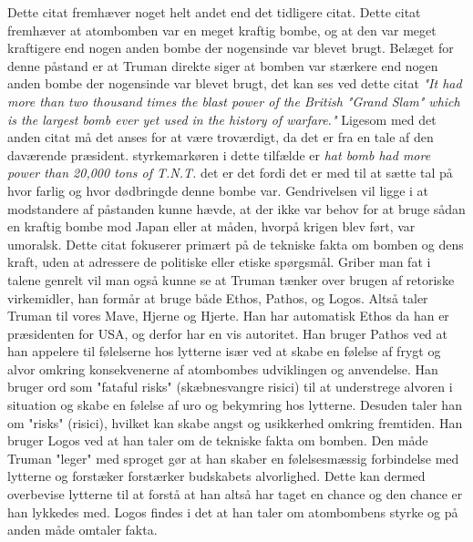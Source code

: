 Dette citat fremhæver noget helt andet end det tidligere citat. Dette citat fremhæver at atombomben var en meget kraftig bombe, og at den var meget kraftigere end nogen anden bombe der nogensinde var blevet brugt. Belæget for denne påstand er at Truman direkte siger at bomben var stærkere end nogen anden bombe der nogensinde var blevet brugt, det kan ses ved dette citat \emph{"It had more than two thousand times the blast power of the British "Grand Slam" which is the largest bomb ever yet used in the history of warfare."} Ligesom med det anden citat må det anses for at være troværdigt, da det er fra en tale af den daværende præsident. styrkemarkøren i dette tilfælde er \emph{hat bomb had more power than 20,000 tons of T.N.T.} det er det fordi det er med til at sætte tal på hvor farlig og hvor dødbringde denne bombe var. Gendrivelsen vil ligge i at modstandere af påstanden kunne hævde, at der ikke var behov for at bruge sådan en kraftig bombe mod Japan eller at måden, hvorpå krigen blev ført, var umoralsk. Dette citat fokuserer primært på de tekniske fakta om bomben og dens kraft, uden at adressere de politiske eller etiske spørgsmål.
Griber man fat i talene genrelt vil man også kunne se at Truman tænker over brugen af retoriske virkemidler, han formår at bruge både Ethos, Pathos, og Logos. Altså taler Truman til vores Mave, Hjerne og Hjerte. Han har automatisk Ethos da han er præsidenten for USA, og derfor har en vis autoritet. Han bruger Pathos ved at han appelere til følelserne hos lytterne  især ved at skabe en følelse af frygt og alvor omkring konsekvenerne af atombombes udviklingen og anvendelse. Han bruger ord som "fataful risks" (skæbnesvangre risici) til at understrege alvoren i situation og skabe en følelse af uro og bekymring hos lytterne. Desuden taler han om "risks" (risici), hvilket kan skabe angst og usikkerhed omkring fremtiden. Han bruger Logos ved at han taler om de tekniske fakta om bomben. Den måde Truman "leger"  med sproget gør at han skaber en følelsesmæssig forbindelse med lytterne og forstæker  forstærker budskabets alvorlighed. Dette kan dermed overbevise lytterne til at forstå at han altså har taget en chance og den chance er han lykkedes med. Logos findes i det at han taler om atombombens styrke og på anden måde omtaler fakta. 

\newpage
